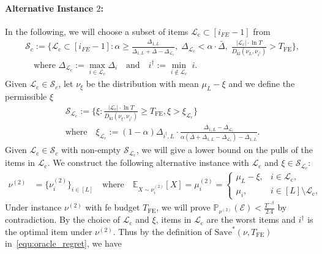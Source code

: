 \documentclass[twoside,11pt]{article}
\newcommand{\kl}{D_{\mathrm{kl}}}
\newcommand{\calE}{\mathcal{E}}
\newcommand{\calL}{\mathcal{L}}
\newcommand{\calS}{\mathcal{S}}
\newcommand{\rmc}{\mathrm{c}}
\newcommand{\bbE}{\mathbb{E}}
\newcommand{\bbP}{\mathbb{P}}
\newcommand{\Tfe}{T_{\mathrm{FE}}}
\newcommand{\Saved}{\mathrm{Save}}
\newcommand{\idagger}{{i^{\dagger}}}
\newcommand{\barDelta}{\bar{\Delta}}
\begin{document}
\paragraph{Alternative Instance $2$:}
In the following, we will choose a subset of items $\calL_{\rmc}\subset [i_{FE}-1]$ from
\begin{align}
    &\calS_c:=\bigg\{
        \calL_{\rmc}\subset  [i_{FE}-1]: \alpha \geq \frac{\Delta_{1,L}}{\Delta_{1,L}+\barDelta-\Delta_{\calL_{\rmc}}},\;
        \Delta_{\calL_{\rmc}}<\alpha\cdot\barDelta,\;
        \frac{|\calL_{\rmc}|\cdot \ln T}{\kl(\nu_L,\nu_{\idagger})} > \Tfe
    \bigg\},
    \\
    &\quad
    \mbox{where }
    \Delta_{\calL_{\rmc}}:=\max_{i\in\calL_{\rmc}}\Delta_{i}
    \quad\mbox{and}\quad
    \idagger:=\min_{i\notin\calL_{\rmc}}\; i.
\end{align}
Given $\calL_{\rmc}\in\calS_c$, let $\nu_\xi$ be the distribution with mean $\mu_L-\xi$ and we define the permissible $\xi$
\begin{align}
    &\calS_{\calL_{\rmc}}
    :=
    \Big\{\xi: \frac{|\calL_{\rmc}|\cdot\ln T}{\kl(\nu_\xi,\nu_{\idagger})} \geq \Tfe,\xi>\xi_{\calL_{\rmc}}\Big\}
    \\
    &
    \mbox{where}\quad \xi_{\calL_{\rmc}}:=(1-\alpha)\Delta_{\idagger,L}\cdot\frac{\Delta_{1,L}-\Delta_{\calL_{\rmc}}}{\alpha(\barDelta+\Delta_{1,L}-\Delta_{\calL_{\rmc}})-\Delta_{1,L}}.
\end{align}
Given $\calL_{\rmc}\in \calS_c$ with non-empty $\calS_{\calL_{\rmc}}$, we will give a lower bound on the pulls of the items in $\calL_{\rmc}$.
We construct the following alternative instance with $\calL_{\rmc}$ and $\xi\in\calS_{\calL_{\rmc}}$:
\begin{align}
\nu^{(2)} 
&= \bigl\{ \nu_i^{(2)}  \bigr\}_{i\in[L]}
\quad\text{where}\quad
 \bbE_{X\sim \nu_i^{(2)}}[X]=
\mu_i^{(2)} =
\begin{cases}
\mu_L-\xi, & i \in \calL_{\rmc}, \\
\mu_i, & i \in [L]\setminus\calL_{\rmc},
\end{cases}
\end{align}
Under instance $\nu^{(2)}$ with \ac{fe} budget $\Tfe$, we will prove $\bbP_{\nu^{(2)}}(\calE)<\frac{T^{-\beta}}{2.4}$ by contradiction. 
By the choice of $\calL_{\rmc}$ and $\xi$, items in $\calL_{\rmc}$ are the worst items and $\idagger$ is the optimal item under $\nu^{(2)}$. Thus by the definition of $\Saved^*(\nu,\Tfe)$ in~\eqref{equ:oracle_regret}, we have
\end{document}
